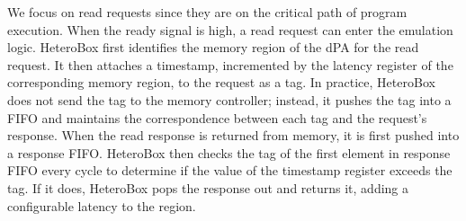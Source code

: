 We focus on read requests since they are on the critical path of program execution.
When the ready signal is high, a read request can enter the emulation logic. HeteroBox first identifies the memory region of the dPA for the read request. It then attaches a timestamp, incremented by the latency register of the corresponding memory region, to the request as a tag. 
In practice, HeteroBox does not send the tag to the memory controller; instead, it pushes the tag into a FIFO and maintains the correspondence between each tag and the request's response.
When the read response is returned from memory, it is first pushed into a response FIFO. 
HeteroBox then checks the tag of the first element in response FIFO every cycle to determine if the value of the timestamp register exceeds the tag. If it does, HeteroBox pops the response out and returns it, adding a configurable latency to the region.



